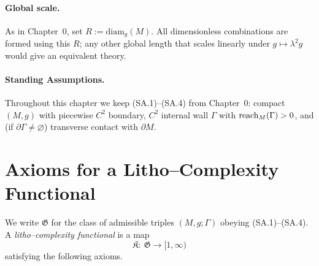 \paragraph{Global scale.} As in Chapter~0, set $R:=\mathrm{diam}_g(M)$. All dimensionless combinations are formed using this $R$; any other global length that scales linearly under $g\mapsto \lambda^2 g$ would give an equivalent theory.

\paragraph{Standing Assumptions.}
Throughout this chapter we keep (SA.1)–(SA.4) from Chapter~0:
compact $(M,g)$ with piecewise $C^2$ boundary, $C^2$ internal wall $\Gamma$ with $\operatorname{reach}_M(\Gamma)>0$, and (if $\partial\Gamma\neq\varnothing$) transverse contact with $\partial M$.

\bigskip

\section{Axioms for a Litho–Complexity Functional}
\label{sec:axioms}

We write $\mathfrak{G}$ for the class of admissible triples $(M,g;\Gamma)$ obeying (SA.1)–(SA.4).
A \emph{litho–complexity functional} is a map
\[
\mathfrak{K}:\ \mathfrak{G}\longrightarrow [1,\infty)
\]
satisfying the following axioms.

